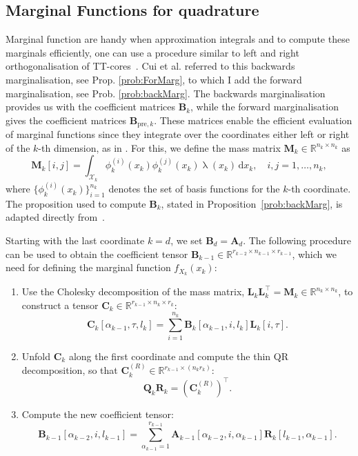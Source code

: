 \subsection{Marginal Functions for quadrature}
Marginal function are handy when approximation integrals and to compute these marginals efficiently, one can use a procedure similar to left and right orthogonalisation of TT-cores~\cite{oseledets2011tensor}.
Cui et al. \cite{cui2022deep} referred to this backwards marginalisation, see Prop. \ref{prob:ForMarg}, to which I add the forward marginalisation, see Prob. \ref{prob:backMarg}. 
The backwards marginalisation provides us with the coefficient matrices $\bm{B}_k$, while the forward marginalisation gives the coefficient matrices $\bm{B}_{\text{pre}, k}$. 
These matrices enable the efficient evaluation of marginal functions since they integrate over the coordinates either left or right of the $k$-th dimension, as in \cite{cui2022deep}.
For this, we define the mass matrix $\bm{M}_k \in \mathbb{R}^{n_k \times n_k}$ as
\begin{equation}
	\bm{M}_k[i, j] = \int_{\mathcal{X}_k} \phi^{(i)}_k(x_k) \phi^{(j)}_k(x_k) \uplambda(x_k) \, \mathrm{d}x_k, \quad i, j = 1, \dots, n_k,
\end{equation}
where $\{\phi^{(i)}_k(x_k)\}_{i=1}^{n_k}$ denotes the set of basis functions for the $k$-th coordinate.
The proposition used to compute $\bm{B}_k$, stated in Proposition~\ref{prob:backMarg}, is adapted directly from~\cite{cui2022deep}.

\begin{prop}
	\label{prob:backMarg}
	Starting with the last coordinate $k = d$, we set $\bm{B}_d = \bm{A}_d$. The following procedure can be used to obtain the coefficient tensor $\bm{B}_{k-1} \in \mathbb{R}^{r_{k-2} \times n_{k-1} \times r_{k-1}}$, which we need for defining the marginal function $f_{X_k}(x_k)$:
	\begin{enumerate}
		\item Use the Cholesky decomposition of the mass matrix, $\bm{L}_k \bm{L}_k^\top = \bm{M}_k \in \mathbb{R}^{n_k \times n_k}$, to construct a tensor $\bm{C}_k \in \mathbb{R}^{r_{k-1} \times n_k \times r_k}$:
		\begin{equation}
			\bm{C}_k[\alpha_{k-1}, \tau, l_k] = \sum_{i=1}^{n_k} \bm{B}_k[\alpha_{k-1}, i, l_k] \bm{L}_k[i, \tau].
		\end{equation}
		\item Unfold $\bm{C}_k$ along the first coordinate and compute the thin QR decomposition, so that $\bm{C}_k^{(R)} \in \mathbb{R}^{r_{k-1} \times (n_k r_k)}$:
		\begin{equation}
			\bm{Q}_k \bm{R}_k = {(\bm{C}_k^{(R)})}^{\top}.
		\end{equation}
		\item Compute the new coefficient tensor:
		\begin{equation}
			\bm{B}_{k-1}[\alpha_{k-2}, i, l_{k-1}] = \sum_{\alpha_{k-1}=1}^{r_{k-1}} \bm{A}_{k-1}[\alpha_{k-2}, i, \alpha_{k-1}] \bm{R}_k[l_{k-1}, \alpha_{k-1}].
		\end{equation}
	\end{enumerate}
\end{prop}

